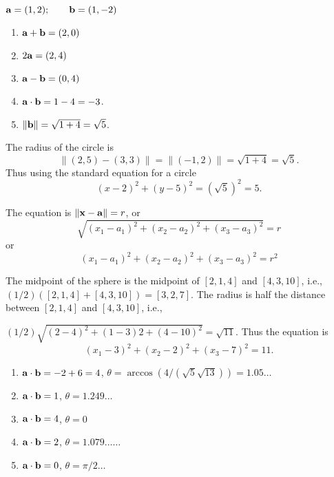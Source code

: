 \vspace{2mm}
$\aa = (1,2);\qquad \bb = (1,-2)$
{\begin{enumerate}
\renewcommand{\labelenumi}{(\alph{enumi})}
\item $\aa + \bb = (2,0)$
\item $2 \aa = (2,4)$
\item $\aa - \bb = (0,4)$
\item $\aa \cdot \bb = 1-4 = -3$.
\item $\| \bb \| = \sqrt{1 + 4} = \sqrt{5}$.
\end{enumerate}}

\vspace{2mm}
The radius of the circle is 
\[
\| (2,5) - (3,3) \| = \|(-1,2)\| = \sqrt{1+4} = \sqrt{5}.
\]
Thus using the standard equation for a circle 
\[
(x-2)^2 + (y-5)^2 = (\sqrt{5})^2 = 5.
\]

\vspace{2mm}
The equation is $\|\xx-\aa\| = r$, or
\[
\sqrt{(x_1-a_1)^2+(x_2-a_2)^2+(x_3-a_3)^2} = r
\]
or
\[
(x_1-a_1)^2+(x_2-a_2)^2+(x_3-a_3)^2 = r^2
\]

\vspace{2mm}
The midpoint of the sphere is the midpoint of $[2,1,4]$ and $[4,3,10]$,
i.e., $(1/2)([2,1,4]+[4,3,10]) = [3,2,7]$. The radius is half the distance
between $[2,1,4]$ and $[4,3,10]$, i.e., \par $(1/2)\sqrt{(2-4)^2+(1-3)2+(4-10)^2} =
\sqrt{11}$. Thus the equation is
\[
(x_1-3)^2+(x_2-2)^2+(x_3-7)^2 = 11.
\]

\vspace{2mm}
{\begin{enumerate}
\renewcommand{\labelenumi}{(\alph{enumi})}
\item $\aa\cdot\bb=-2+6=4$, $\theta = \arccos(4/(\sqrt{5}\sqrt{13})) =
1.05\ldots$
\item $\aa\cdot\bb= 1$, $\theta = 1.249\ldots$
\item $\aa\cdot\bb= 4$, $\theta = 0$
\item $\aa\cdot\bb= 2$, $\theta = 1.079\ldots\ldots$
\item $\aa\cdot\bb= 0$, $\theta = \pi/2\ldots$
\end{enumerate}}

